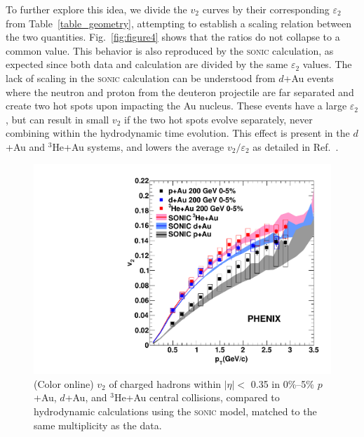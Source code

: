 \documentclass[%
reprint,
showpacs,preprintnumbers,
 amsmath,amssymb,
 aps,
]{revtex4-1}
\newcommand{\dau}{\mbox{$d$+Au}\xspace}
\newcommand{\pau}{\mbox{$p$+Au}\xspace}
\newcommand{\hau}{\mbox{$^3\text{He}$+Au}\xspace}
\begin{document}
To further explore this idea, we divide the $v_2$ curves by their corresponding $\varepsilon_2$ from Table~\ref{table_geometry}, attempting to establish a scaling relation between the two quantities. Fig.~\ref{fig:figure4} shows that the ratios do not collapse to a common value. This behavior is also reproduced by the \textsc{sonic} calculation, as expected since both data and calculation are divided by the same $\varepsilon_2$ values. The lack of scaling in the \textsc{sonic} calculation can be understood from \dau events where the neutron and proton from the deuteron projectile are far separated and create two hot spots upon impacting the Au nucleus. These events have a large $\varepsilon_2$, but can result in small $v_2$ if the two hot spots evolve separately, never combining within the hydrodynamic time evolution. This effect is present in the \dau and \hau systems, and lowers the average $v_2/\varepsilon_2$ as detailed in Ref.~\cite{nagle_exploiting_2013}. 

\begin{figure}[htbp]
  \includegraphics[scale=0.45]{Figures/figure3.pdf}
  \caption{(Color online) $v_2$ of charged hadrons within $|\eta| <$ 0.35 in 0\%--5\% \pau, \dau, and \hau central collisions, compared to hydrodynamic calculations using the \textsc{sonic} model, matched to the same multiplicity as the data.}
\label{fig:figure3}
\end{figure}
\end{document}
